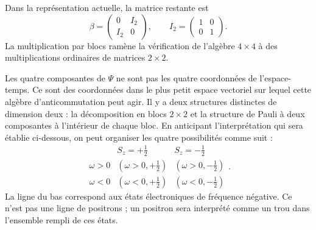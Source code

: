 \begin{classroomqa}\end{classroomqa}

Dans la représentation actuelle, la matrice restante est
\begin{equation}
\beta=
\begin{pmatrix}
0&I_2\\
I_2&0
\end{pmatrix},
\qquad
I_2=
\begin{pmatrix}
1&0\\
0&1
\end{pmatrix}.
\end{equation}
La multiplication par blocs ramène la vérification de l’algèbre \(4\times4\) à des multiplications ordinaires de matrices \(2\times2\).

\begin{classroomqa}\end{classroomqa}

Les quatre composantes de \(\Psi\) ne sont pas les quatre coordonnées de l’espace-temps. Ce sont des coordonnées dans le plus petit espace vectoriel sur lequel cette algèbre d’anticommutation peut agir. Il y a deux structures distinctes de dimension deux : la décomposition en blocs \(2\times2\) et la structure de Pauli à deux composantes à l’intérieur de chaque bloc. En anticipant l’interprétation qui sera établie ci-dessous, on peut organiser les quatre possibilités comme suit :
\begin{equation}
\begin{array}{c|cc}
& S_z=+\tfrac12 & S_z=-\tfrac12\\ \hline
\omega>0 & (\omega>0,+\tfrac12) & (\omega>0,-\tfrac12)\\
\omega<0 & (\omega<0,+\tfrac12) & (\omega<0,-\tfrac12)
\end{array}.
\end{equation}
La ligne du bas correspond aux états électroniques de fréquence négative. Ce n’est pas une ligne de positrons ; un positron sera interprété comme un trou dans l’ensemble rempli de ces états.

